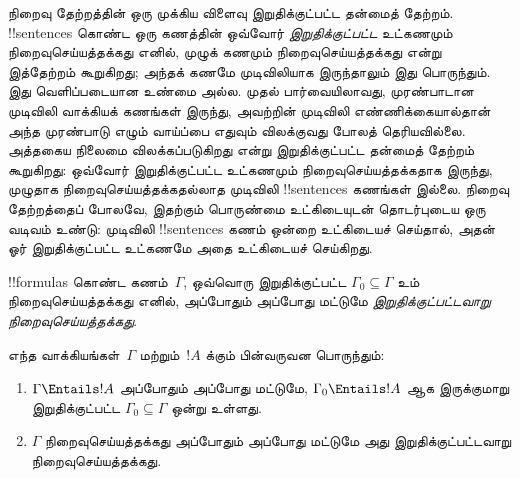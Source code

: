 \documentclass[../../../include/open-logic-section]{subfiles}
\begin{document}
      {}
      {}


நிறைவு தேற்றத்தின் ஒரு முக்கிய விளைவு இறுதிக்குட்பட்ட தன்மைத் தேற்றம்.
!!{sentence}s கொண்ட ஒரு கணத்தின் ஒவ்வோர் \emph{இறுதிக்குட்பட்ட} உட்கணமும்
நிறைவுசெய்யத்தக்கது எனில், முழுக் கணமும் நிறைவுசெய்யத்தக்கது என்று இத்தேற்றம்
கூறுகிறது; அந்தக் கணமே முடிவிலியாக இருந்தாலும் இது பொருந்தும். இது
வெளிப்படையான உண்மை அல்ல. முதல் பார்வையிலாவது, முரண்பாடான முடிவிலி வாக்கியக்
கணங்கள் இருந்து, அவற்றின் முடிவிலி எண்ணிக்கையால்தான் அந்த முரண்பாடு எழும்
வாய்ப்பை எதுவும் விலக்குவது போலத் தெரியவில்லை. அத்தகைய நிலைமை விலக்கப்படுகிறது
என்று இறுதிக்குட்பட்ட தன்மைத் தேற்றம் கூறுகிறது: ஒவ்வோர் இறுதிக்குட்பட்ட
உட்கணமும் நிறைவுசெய்யத்தக்கதாக இருந்து, முழுதாக நிறைவுசெய்யத்தக்கதல்லாத
முடிவிலி !!{sentence}s கணங்கள் இல்லை. நிறைவு தேற்றத்தைப் போலவே,
இதற்கும் பொருண்மை உட்கிடையுடன் தொடர்புடைய ஒரு வடிவம் உண்டு: முடிவிலி
!!{sentence}s கணம் ஒன்றை உட்கிடையச் செய்தால், அதன் ஓர் இறுதிக்குட்பட்ட
உட்கணமே அதை உட்கிடையச் செய்கிறது.

\begin{defn}
  !!{formula}s கொண்ட கணம்~$\Gamma$, ஒவ்வொரு இறுதிக்குட்பட்ட
  $\Gamma_0 \subseteq \Gamma$ உம் நிறைவுசெய்யத்தக்கது எனில், அப்போதும்
  அப்போது மட்டுமே \emph{இறுதிக்குட்பட்டவாறு நிறைவுசெய்யத்தக்கது}.
\end{defn}

\begin{thm}[இறுதிக்குட்பட்ட தன்மைத் தேற்றம்]
எந்த வாக்கியங்கள்~$\Gamma$ மற்றும்~$!A$ க்கும் பின்வருவன பொருந்தும்:
\begin{enumerate}
  \item $\Gamma \Entails !A$ அப்போதும் அப்போது மட்டுமே,
    $\Gamma_0 \Entails !A$ ஆக இருக்குமாறு இறுதிக்குட்பட்ட
    $\Gamma_0 \subseteq \Gamma$ ஒன்று உள்ளது.
  \item $\Gamma$ நிறைவுசெய்யத்தக்கது அப்போதும் அப்போது மட்டுமே அது
    இறுதிக்குட்பட்டவாறு நிறைவுசெய்யத்தக்கது.
\end{enumerate}
\end{thm}
\end{document}
